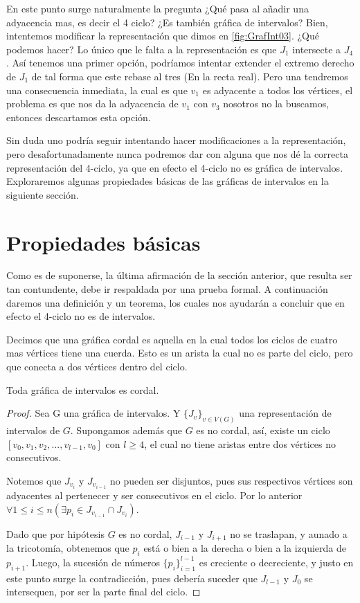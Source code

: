 En este punto surge naturalmente la pregunta ¿Qué pasa al añadir una adyacencia mas, es decir el 4 ciclo? ¿Es también gráfica de intervalos?
Bien, intentemos modificar la representación que dimos en \cref{fig:GrafInt03}. ¿Qué podemos hacer? Lo único que le falta a la representación es que $J_1$ intersecte a $J_4$. Así tenemos una primer opción, podríamos intentar extender el extremo derecho de $J_1$ de tal forma que este rebase al tres (En la recta real). Pero una tendremos una consecuencia inmediata, la cual es que $v_1$ es adyacente a todos los vértices, el problema es que nos da la adyacencia de $v_1$ con $v_3$ nosotros no la buscamos, entonces descartamos esta opción.

Sin duda uno podría seguir intentando hacer modificaciones a la representación, pero desafortunadamente nunca podremos dar con alguna que nos dé la correcta representación del 4-ciclo, ya que en efecto el 4-ciclo no es gráfica de intervalos.   Exploraremos algunas propiedades b\'asicas de las gr\'aficas de intervalos en la siguiente secci\'on.

\section{Propiedades b\'asicas}

Como es de suponerse, la última afirmación de la secci\'on anterior, que resulta ser tan contundente, debe ir respaldada por una prueba formal. 
A continuación daremos una definición y un teorema, los cuales nos ayudarán a concluir que en efecto el 4-ciclo no es de intervalos.

Decimos que una gráfica cordal es aquella en la cual todos los ciclos de cuatro mas vértices tiene una cuerda. Esto es un arista la cual no es parte del ciclo, pero que conecta a dos vértices dentro del ciclo.

\begin{teorema}
\label{teo:Int-Chord}
    Toda gráfica de intervalos es cordal.
\end{teorema}

\begin{proof}
    Sea G una gráfica de intervalos. Y $\{ J_v \}_{v \in V(G)}$ una representación de intervalos de $G$.
    Supongamos además que $G$ es no cordal, así, existe un ciclo $[v_0,v_1,v_2,...,v_{l-1},v_0]$ con $l \geq 4$, el cual no tiene aristas entre dos vértices no consecutivos.
    
    Notemos que $J_{v_i}$ y $J_{v_{i-1}}$ no pueden ser disjuntos, pues sus respectivos vértices son adyacentes al pertenecer y ser consecutivos en el ciclo. Por lo anterior $\forall 1 \leq i \leq n  (\exists p_i \in J_{v_{i-1}}\cap J_{v_i})$.
    
    Dado que por hipótesis $G$ es no cordal, $J_{i-1}$ y $J_{i+1}$ no se traslapan, y aunado a la tricotomía, obtenemos que $p_i$ está o bien a la derecha o bien a la izquierda de $p_{i+1}$.
    Luego, la sucesión de números $\{ p_i \}_{i=1}^{l-1}$ es creciente o decreciente, y justo en este punto surge la contradicción, pues debería suceder que $J_{l-1}$ y $J_0$ se intersequen, por ser la parte final del ciclo.
\end{proof}

